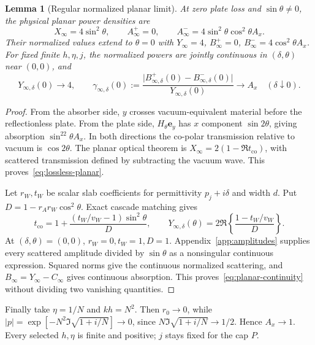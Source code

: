 \documentclass[11pt]{article}
\newtheorem{lemma}[theorem]{Lemma}
\newcommand{\ey}{\mathbf e_y}
\newcommand{\abs}[1]{\lvert #1\rvert}
\begin{document}
\begin{lemma}[Regular normalized planar limit]\label{lem:planar}
At zero plate loss and $\sin\theta\ne0$, the physical planar power densities are
\begin{equation}\label{eq:lossless-planar}
 X_\infty=4\sin^2\theta,\qquad
 A_\infty^+=0,\qquad
 A_\infty^-=4\sin^2\theta\cos^2\theta A_x.
\end{equation}
Their normalized values extend to $\theta=0$ with $Y_\infty=4$, $B_\infty^+=0$, $B_\infty^-=4\cos^2\theta A_x$. For fixed finite $h,\eta,j$, the normalized powers are jointly continuous in $(\delta,\theta)$ near $(0,0)$, and
\begin{equation}\label{eq:planar-continuity}
 Y_{\infty,\delta}(0)\to4,\qquad
 \gamma_{\infty,\delta}(0):=
 \frac{\abs{B_{\infty,\delta}^+(0)-B_{\infty,\delta}^-(0)}}{Y_{\infty,\delta}(0)}\to A_x
 \quad(\delta\downarrow0).
\end{equation}
\end{lemma}
\begin{proof}
From the absorber side, $y$ crosses vacuum-equivalent material before the reflectionless plate. From the plate side, $H_\theta\ey$ has $x$ component $\sin2\theta$, giving absorption $\sin^22\theta A_x$. In both directions the co-polar transmission relative to vacuum is $\cos2\theta$. The planar optical theorem is $X_\infty=2(1-\Re t_{\mathrm{co}})$, with scattered transmission defined by subtracting the vacuum wave. This proves~\eqref{eq:lossless-planar}.

Let $r_W,t_W$ be scalar slab coefficients for permittivity $p_j+i\delta$ and width $d$. Put $D=1-r_Ar_W\cos^2\theta$. Exact cascade matching gives
\begin{equation}\label{eq:planar-formula}
 t_{\mathrm{co}}=1+\frac{(t_W/v_W-1)\sin^2\theta}{D},\qquad
 Y_{\infty,\delta}(\theta)=2\Re\left\{\frac{1-t_W/v_W}{D}\right\}.
\end{equation}
At $(\delta,\theta)=(0,0)$, $r_W=0,t_W=1,D=1$. Appendix~\ref{app:amplitudes} supplies every scattered amplitude divided by $\sin\theta$ as a nonsingular continuous expression. Squared norms give the continuous normalized scattering, and $B_\infty=Y_\infty-C_\infty$ gives continuous absorption. This proves~\eqref{eq:planar-continuity} without dividing two vanishing quantities.
\end{proof}
Finally take $\eta=1/N$ and $kh=N^2$. Then $r_0\to0$, while $\abs p=\exp[-N^2\Im\sqrt{1+i/N}]\to0$, since $N\Im\sqrt{1+i/N}\to1/2$. Hence $A_x\to1$. Every selected $h,\eta$ is finite and positive; $j$ stays fixed for the cap $P$.
\end{document}
